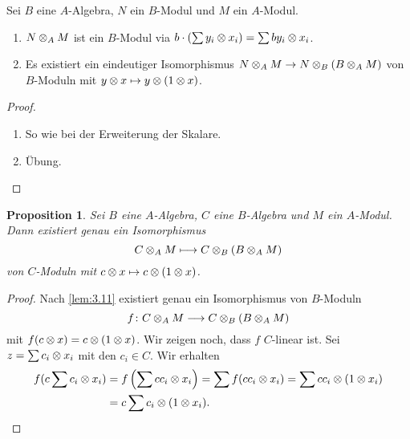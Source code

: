 \documentclass[12pt,a4paper]{scrartcl}
\theoremstyle{cplain}
\newtheorem{prop}[thmcounter]{Proposition}
\theoremstyle{cdef}
\begin{document}
\begin{lem} \label{lem:3.11}
	Sei $B$ eine $A$-Algebra, $N$ ein $B$-Modul und $M$ ein $A$-Modul.
	\begin{enumerate}
		\item $N\otimes_AM$ ist ein $B$-Modul via $b\cdot(\sum y_i\otimes x_i) = \sum by_i\otimes x_i$. \label{lem:311:i}
		\item Es existiert ein eindeutiger Isomorphismus $N\otimes_AM\to N\otimes_B(B\otimes_AM)$ von $B$-Moduln mit $y\otimes x\mapsto y\otimes (1\otimes x)$. \label{lem:311:ii}
	\end{enumerate}
\end{lem}
\begin{proof}
	\leavevmode
	\begin{enumerate}[label=\ref{lem:311:\roman*}]
		\item So wie bei der Erweiterung der Skalare.
		\item Übung. \qedhere
	\end{enumerate}
\end{proof}

\begin{prop} \label{prop:3.12}
	Sei $B$ eine $A$-Algebra, $C$ eine $B$-Algebra und $M$ ein $A$-Modul. Dann existiert genau ein Isomorphismus
	$$C\otimes_A M  \longmapsto  C\otimes_B(B\otimes_AM)$$
	von $C$-Moduln mit $c\otimes x\mapsto c\otimes(1\otimes x)$.
\end{prop}
\begin{proof}
	Nach \cref{lem:3.11} existiert genau ein Isomorphismus von $B$-Moduln
	\[ f\colon C\otimes_AM\longrightarrow C\otimes_B(B\otimes_AM)\]
	mit $f(c\otimes x) = c\otimes(1\otimes x)$. Wir zeigen noch, dass $f$ $C$-linear ist. Sei $z = \sum c_i\otimes x_i$ mit den $c_i\in C$. Wir erhalten
	\begin{align*}
		f(c\sum c_i\otimes x_i) &= f\left(\sum cc_i\otimes x_i \right) = \sum f(cc_i\otimes x_i) = \sum cc_i\otimes(1\otimes x_i) \\
		&= c\sum c_i\otimes(1\otimes x_i). \qedhere
	\end{align*}
\end{proof}
\end{document}
